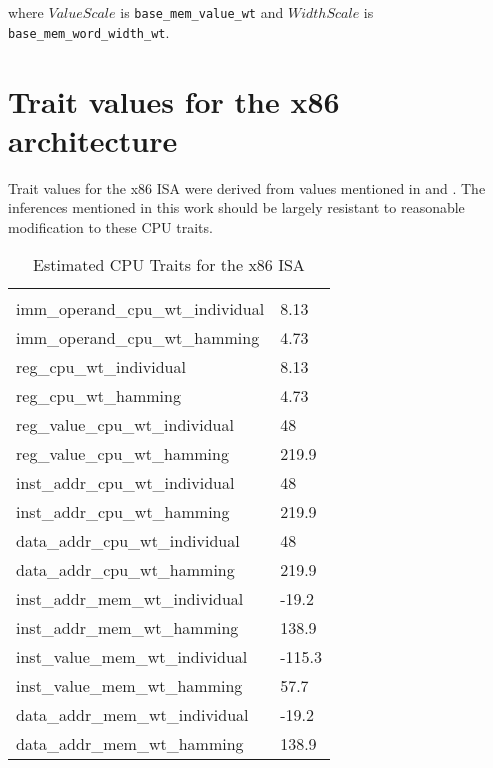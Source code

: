where $ValueScale$ is \texttt{base\_mem\_value\_wt} and $WidthScale$
is \texttt{base\_mem\_word\_width\_wt}.

\section{Trait values for the x86 architecture}

\label{sec:traits-values}

Trait values for the x86 ISA were derived from values mentioned in
\cite{steinke} and \cite{lee}.  The inferences mentioned in this work
should be largely resistant to reasonable modification to these CPU
traits.

\begin{longtable}{l|l}
  \caption{Estimated CPU Traits for the x86 ISA} \\

  \hline \\

  imm\_operand\_cpu\_wt\_individual & 8.13 \\
  imm\_operand\_cpu\_wt\_hamming & 4.73 \\

  reg\_cpu\_wt\_individual & 8.13 \\
  reg\_cpu\_wt\_hamming & 4.73 \\

  reg\_value\_cpu\_wt\_individual & 48 \\
  reg\_value\_cpu\_wt\_hamming & 219.9 \\

  inst\_addr\_cpu\_wt\_individual & 48 \\
  inst\_addr\_cpu\_wt\_hamming & 219.9 \\

  data\_addr\_cpu\_wt\_individual & 48 \\
  data\_addr\_cpu\_wt\_hamming & 219.9 \\

  inst\_addr\_mem\_wt\_individual & -19.2 \\
  inst\_addr\_mem\_wt\_hamming & 138.9 \\

  inst\_value\_mem\_wt\_individual & -115.3 \\
  inst\_value\_mem\_wt\_hamming & 57.7 \\

  data\_addr\_mem\_wt\_individual & -19.2 \\
  data\_addr\_mem\_wt\_hamming & 138.9 \\


\end{longtable}
